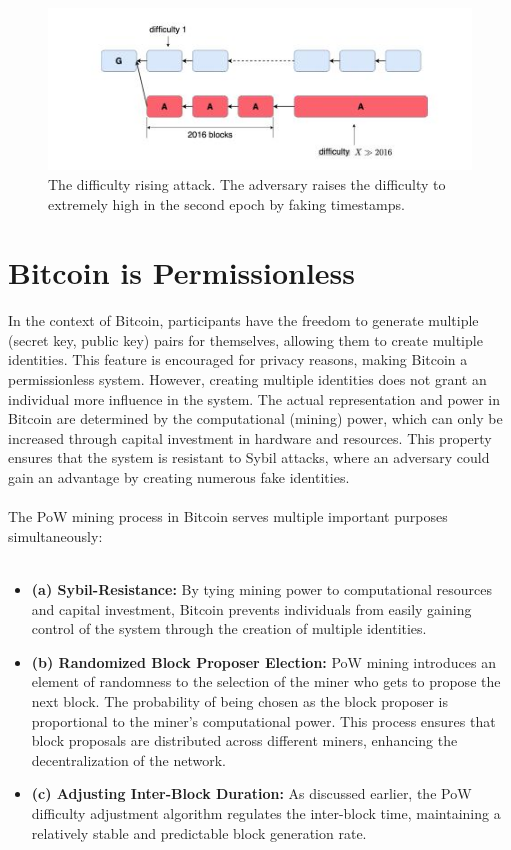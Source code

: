 \begin{center}
    \begin{figure}[h!]
        \centering
        \includegraphics[width=0.6\linewidth]{Fig/03/F5}
        \caption{The difficulty rising attack. The adversary raises the difficulty to extremely high in the second epoch by faking timestamps.}
        \label{fig:f5}
    \end{figure}
\end{center}
\section{Bitcoin is Permissionless}
In the context of Bitcoin, participants have the freedom to generate multiple (secret key, public key) pairs for themselves, allowing them to create multiple identities. This feature is encouraged for privacy reasons, making Bitcoin a permissionless system. However, creating multiple identities does not grant an individual more influence in the system. The actual representation and power in Bitcoin are determined by the computational (mining) power, which can only be increased through capital investment in hardware and resources. This property ensures that the system is resistant to Sybil attacks, where an adversary could gain an advantage by creating numerous fake identities.\\\\
The PoW mining process in Bitcoin serves multiple important purposes simultaneously:\\\\
\begin{itemize}
    \item \textbf{(a) Sybil-Resistance: }By tying mining power to computational resources and capital investment, Bitcoin prevents individuals from easily gaining control of the system through the creation of multiple identities.
    \item \textbf{(b) Randomized Block Proposer Election: }PoW mining introduces an element of randomness to the selection of the miner who gets to propose the next block. The probability of being chosen as the block proposer is proportional to the miner's computational power. This process ensures that block proposals are distributed across different miners, enhancing the decentralization of the network.
    \item \textbf{(c) Adjusting Inter-Block Duration:} As discussed earlier, the PoW difficulty adjustment algorithm regulates the inter-block time, maintaining a relatively stable and predictable block generation rate.
\end{itemize}
